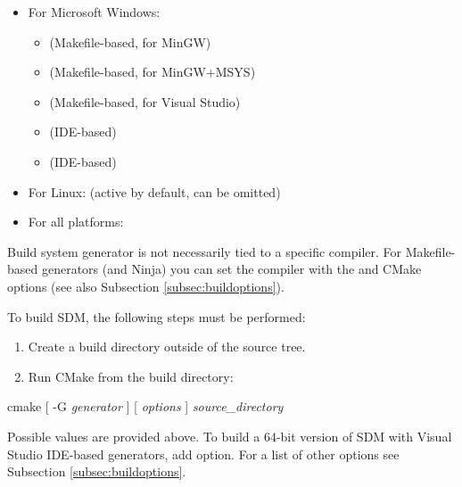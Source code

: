 \documentclass[a4paper,12pt,twoside,extrafontsizes]{memoir}
\begin{document}
\begin{itemize}
	\item For Microsoft Windows:
	\begin{itemize}
		\item {} (Makefile-based, for MinGW)
		\item {} (Makefile-based, for MinGW+MSYS)
		\item {} (Makefile-based, for Visual Studio)
		\item {} (IDE-based)
		\item {} (IDE-based)
	\end{itemize}
	\item For Linux:  (active by default, can be omitted)
	\item For all platforms: 
\end{itemize}

Build system generator is not necessarily tied to a specific compiler. For Makefile-based generators (and Ninja) you can set the compiler with the  and  CMake options (see also Subsection \ref{subsec:buildoptions}).

To build SDM, the following steps must be performed:

\begin{enumerate}
	\item Create a build directory outside of the source tree.
	\item Run CMake from the build directory:
\end{enumerate}

\begin{shellcmds}
cmake [ -G \emph{generator} ] [ \emph{options} ] \emph{source\_directory}
\end{shellcmds}

Possible  values are provided above. To build a 64-bit version of SDM with Visual Studio IDE-based generators, add  option. For a list of other options see Subsection \ref{subsec:buildoptions}.
\end{document}
